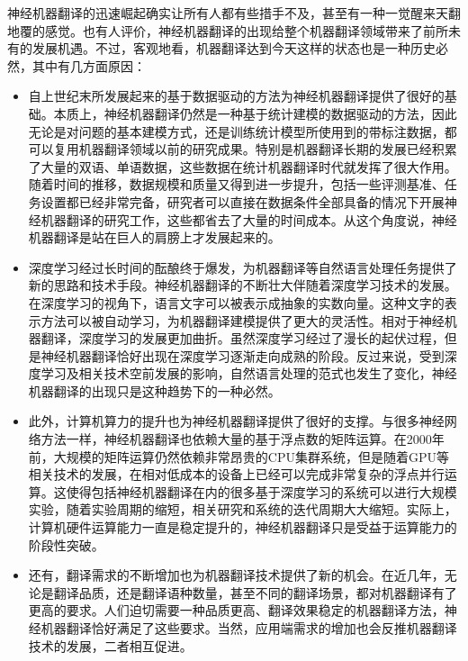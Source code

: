 \parinterval 神经机器翻译的迅速崛起确实让所有人都有些措手不及，甚至有一种一觉醒来天翻地覆的感觉。也有人评价，神经机器翻译的出现给整个机器翻译领域带来了前所未有的发展机遇。不过，客观地看，机器翻译达到今天这样的状态也是一种历史必然，其中有几方面原因：

\begin{itemize}
\vspace{0.5em}
\item 自上世纪末所发展起来的基于数据驱动的方法为神经机器翻译提供了很好的基础。本质上，神经机器翻译仍然是一种基于统计建模的数据驱动的方法，因此无论是对问题的基本建模方式，还是训练统计模型所使用到的带标注数据，都可以复用机器翻译领域以前的研究成果。特别是机器翻译长期的发展已经积累了大量的双语、单语数据，这些数据在统计机器翻译时代就发挥了很大作用。随着时间的推移，数据规模和质量又得到进一步提升，包括一些评测基准、任务设置都已经非常完备，研究者可以直接在数据条件全部具备的情况下开展神经机器翻译的研究工作，这些都省去了大量的时间成本。从这个角度说，神经机器翻译是站在巨人的肩膀上才发展起来的。
\vspace{0.5em}
\item 深度学习经过长时间的酝酿终于爆发，为机器翻译等自然语言处理任务提供了新的思路和技术手段。神经机器翻译的不断壮大伴随着深度学习技术的发展。在深度学习的视角下，语言文字可以被表示成抽象的实数向量。这种文字的表示方法可以被自动学习，为机器翻译建模提供了更大的灵活性。相对于神经机器翻译，深度学习的发展更加曲折。虽然深度学习经过了漫长的起伏过程，但是神经机器翻译恰好出现在深度学习逐渐走向成熟的阶段。反过来说，受到深度学习及相关技术空前发展的影响，自然语言处理的范式也发生了变化，神经机器翻译的出现只是这种趋势下的一种必然。
\vspace{0.5em}
\item 此外，计算机算力的提升也为神经机器翻译提供了很好的支撑。与很多神经网络方法一样，神经机器翻译也依赖大量的基于浮点数的矩阵运算。在2000年前，大规模的矩阵运算仍然依赖非常昂贵的CPU集群系统，但是随着GPU等相关技术的发展，在相对低成本的设备上已经可以完成非常复杂的浮点并行运算。这使得包括神经机器翻译在内的很多基于深度学习的系统可以进行大规模实验，随着实验周期的缩短，相关研究和系统的迭代周期大大缩短。实际上，计算机硬件运算能力一直是稳定提升的，神经机器翻译只是受益于运算能力的阶段性突破。
\vspace{0.5em}
\item 还有，翻译需求的不断增加也为机器翻译技术提供了新的机会。在近几年，无论是翻译品质，还是翻译语种数量，甚至不同的翻译场景，都对机器翻译有了更高的要求。人们迫切需要一种品质更高、翻译效果稳定的机器翻译方法，神经机器翻译恰好满足了这些要求。当然，应用端需求的增加也会反推机器翻译技术的发展，二者相互促进。
\vspace{0.5em}
\end{itemize}

